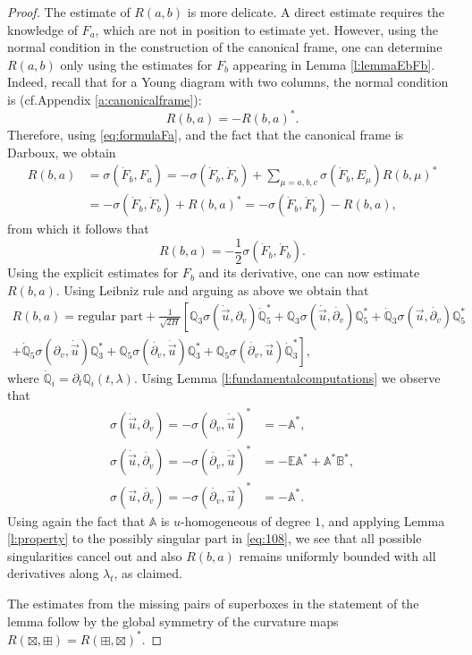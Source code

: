 \documentclass[11pt,a4paper]{article}
\theoremstyle{plain}
\theoremstyle{definition}
\theoremstyle{remark}
\numberwithin{equation}{section}
\newcommand{\A}{\mathbb{A}}
\newcommand{\B}{\mathbb{B}}
\newcommand{\E}{\mathbb{E}}
\newcommand{\Q}{\mathbb{Q}}
\begin{document}
\begin{proof}
The estimate of $R(a,b)$ is more delicate. A direct estimate requires the knowledge of $F_a$, which are not in position to estimate yet. However, using the normal condition in the construction of the canonical frame, one can determine $R(a,b)$ only using the estimates for $F_b$ appearing in Lemma \ref{l:lemmaEbFb}. Indeed, recall that for a Young diagram with two columns, the normal condition is (cf.\@ Appendix \ref{a:canonicalframe}):
\begin{equation}
R(b,a) = -R(b,a)^*.
\end{equation}
Therefore, using \eqref{eq:formulaFa}, and the fact that the canonical frame is Darboux, we obtain
\begin{align}
R(b,a) & = \sigma(\dot{F}_b,F_a)  = -\sigma(\dot{F}_b,\dot{F}_b) + \sum_{\mu=a,b,c}\sigma(\dot{F}_b,E_\mu)R(b,\mu)^* \\
& = -\sigma(\dot{F}_b,\dot{F}_b) + R(b,a)^*  =-\sigma(\dot{F}_b,\dot{F}_b) - R(b,a),
\end{align}
from which it follows that
\begin{equation}
R(b,a) =  -\frac{1}{2}\sigma(\dot{F}_b,\dot{F}_b).
\end{equation}
Using the explicit estimates for $F_b$ and its derivative, one can now estimate $R(b,a)$. Using Leibniz rule and arguing as above we obtain that
\begin{multline}\label{eq:108}
R(b,a) = \text{regular part} + \frac{1}{\sqrt{2H}}\left[\Q_3 \sigma(\dot{\vec{u}},\partial_v)\dot{\Q}_5^* + \Q_3 \sigma(\dot{\vec{u}},\dot{\partial_v})\Q_5^* + \dot{\Q}_3 \sigma(\vec{u},\dot{\partial_v})\Q_5^* \right. \\
\left. + \dot{\Q}_5 \sigma(\partial_v,\dot{\vec{u}})\Q_3^* + \Q_5\sigma(\dot{\partial_v},\dot{\vec{u}})\Q_3^* + \Q_5\sigma(\dot{\partial_v},\vec{u})\dot{\Q}_3^*\right],
\end{multline}
where $\dot{\Q}_i = \partial_t\Q_i(t,\lambda)$. Using Lemma \ref{l:fundamentalcomputations} we observe that
\begin{align}
\sigma(\dot{\vec{u}},\partial_v)  = -\sigma(\partial_v,\dot{\vec{u}})^* &  =  -\A^*, \\
\sigma(\dot{\vec{u}},\dot{\partial_v})  = -\sigma(\dot{\partial_v},\dot{\vec{u}})^* & = -\E\A^* + \A^*\B^*,\\
\sigma(\vec{u},\dot{\partial_v})  = -\sigma(\dot{\partial_v},\vec{u})^* & = -\A^*.
\end{align}
Using again the fact that $\A$ is $u$-homogeneous of degree $1$, and applying Lemma \ref{l:property} to the possibly singular part in \eqref{eq:108}, we see that all possible singularities cancel out and also $R(b,a)$ remains uniformly bounded with all derivatives along $\lambda_t$, as claimed.

The estimates from the missing pairs of superboxes in the statement of the lemma follow by the global symmetry of the curvature maps $R(\boxtimes,\boxplus) = R(\boxplus,\boxtimes)^*$.
\end{proof}
\end{document}
